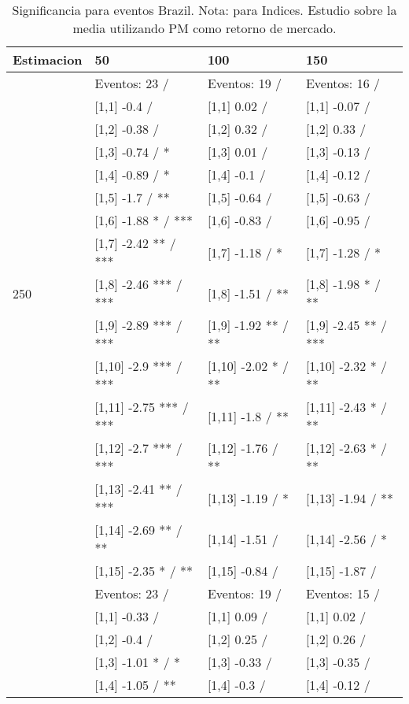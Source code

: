 \begin{table}

\caption{Significancia para eventos Brazil. Nota: para Indices. Estudio sobre la media utilizando PM como retorno de mercado.}
\centering
\begin{tabular}[t]{llll}
\toprule
Estimacion & 50 & 100 & 150\\
\midrule
 & Eventos:  23 / & Eventos:  19 / & Eventos:  16 /\\
 & {}[1,1] -0.4  / & {}[1,1] 0.02  / & {}[1,1] -0.07  /\\
 & {}[1,2] -0.38  / & {}[1,2] 0.32  / & {}[1,2] 0.33  /\\
 & {}[1,3] -0.74  / * & {}[1,3] 0.01  / & {}[1,3] -0.13  /\\
 & {}[1,4] -0.89  / * & {}[1,4] -0.1  / & {}[1,4] -0.12  /\\
\addlinespace
 & {}[1,5] -1.7  / ** & {}[1,5] -0.64  / & {}[1,5] -0.63  /\\
 & {}[1,6] -1.88 * / *** & {}[1,6] -0.83  / & {}[1,6] -0.95  /\\
 & {}[1,7] -2.42 ** / *** & {}[1,7] -1.18  / * & {}[1,7] -1.28  / *\\
250 & {}[1,8] -2.46 *** / *** & {}[1,8] -1.51  / ** & {}[1,8] -1.98 * / **\\
 & {}[1,9] -2.89 *** / *** & {}[1,9] -1.92 ** / ** & {}[1,9] -2.45 ** / ***\\
\addlinespace
 & {}[1,10] -2.9 *** / *** & {}[1,10] -2.02 * / ** & {}[1,10] -2.32 * / **\\
 & {}[1,11] -2.75 *** / *** & {}[1,11] -1.8  / ** & {}[1,11] -2.43 * / **\\
 & {}[1,12] -2.7 *** / *** & {}[1,12] -1.76  / ** & {}[1,12] -2.63 * / **\\
 & {}[1,13] -2.41 ** / *** & {}[1,13] -1.19  / * & {}[1,13] -1.94  / **\\
 & {}[1,14] -2.69 ** / ** & {}[1,14] -1.51  / & {}[1,14] -2.56  / *\\
\addlinespace
 & {}[1,15] -2.35 * / ** & {}[1,15] -0.84  / & {}[1,15] -1.87  /\\
 & Eventos:  23 / & Eventos:  19 / & Eventos:  15 /\\
 & {}[1,1] -0.33  / & {}[1,1] 0.09  / & {}[1,1] 0.02  /\\
 & {}[1,2] -0.4  / & {}[1,2] 0.25  / & {}[1,2] 0.26  /\\
 & {}[1,3] -1.01 * / * & {}[1,3] -0.33  / & {}[1,3] -0.35  /\\
\addlinespace
 & {}[1,4] -1.05  / ** & {}[1,4] -0.3  / & {}[1,4] -0.12  /\\

\end{tabular}
\end{table}
